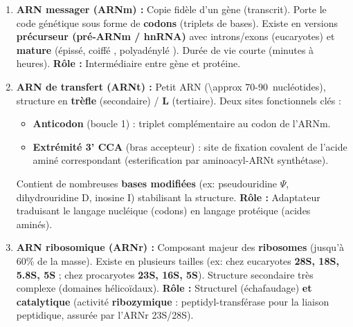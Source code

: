 \documentclass[11pt]{article}
\begin{document}
\begin{definition}
\begin{enumerate}
    \item \textbf{ARN messager (ARNm) :} Copie fidèle d'un gène (transcrit). Porte le code génétique sous forme de \textbf{codons} (triplets de bases). Existe en versions \textbf{précurseur (pré-ARNm / hnRNA)} avec introns/exons (eucaryotes) et \textbf{mature} (épissé, coiffé , polyadénylé ). Durée de vie courte (minutes à heures). \textbf{Rôle :} Intermédiaire entre gène et protéine.
    \item \textbf{ARN de transfert (ARNt) :} Petit ARN (\SI{\approx 70-90}{nucléotides}), structure en \textbf{trèfle} (secondaire) / \textbf{L} (tertiaire). Deux sites fonctionnels clés :
    \begin{itemize}
        \item \textbf{Anticodon} (boucle 1) : triplet complémentaire au codon de l'ARNm.
        \item \textbf{Extrémité 3' CCA} (bras accepteur) : site de fixation covalent de l'acide aminé correspondant (esterification par aminoacyl-ARNt synthétase).
    \end{itemize}
    Contient de nombreuses \textbf{bases modifiées} (ex: pseudouridine $\Psi$, dihydrouridine D, inosine I) stabilisant la structure. \textbf{Rôle :} Adaptateur traduisant le langage nucléique (codons) en langage protéique (acides aminés).
    \item \textbf{ARN ribosomique (ARNr) :} Composant majeur des \textbf{ribosomes} (jusqu'à 60\% de la masse). Existe en plusieurs tailles (ex: chez eucaryotes \textbf{28S, 18S, 5.8S, 5S} ; chez procaryotes \textbf{23S, 16S, 5S}). Structure secondaire très complexe (domaines hélicoïdaux). \textbf{Rôle :} Structurel (échafaudage) \textbf{et catalytique} (activité \textbf{ribozymique} : peptidyl-transférase pour la liaison peptidique, assurée par l'ARNr 23S/28S).
\end{enumerate}
\end{definition}
\end{document}
